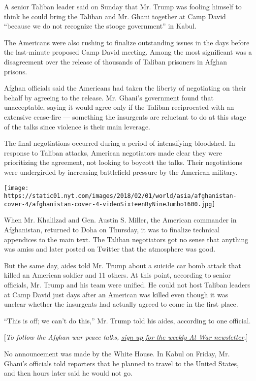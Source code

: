 A senior Taliban leader said on Sunday that Mr. Trump was fooling
himself to think he could bring the Taliban and Mr. Ghani together at
Camp David ``because we do not recognize the stooge government'' in
Kabul.

The Americans were also rushing to finalize outstanding issues in the
days before the last-minute proposed Camp David meeting. Among the most
significant was a disagreement over the release of thousands of Taliban
prisoners in Afghan prisons.

Afghan officials said the Americans had taken the liberty of negotiating
on their behalf by agreeing to the release. Mr. Ghani's government found
that unacceptable, saying it would agree only if the Taliban
reciprocated with an extensive cease-fire --- something the insurgents
are reluctant to do at this stage of the talks since violence is their
main leverage.

The final negotiations occurred during a period of intensifying
bloodshed. In response to Taliban attacks, American negotiators made
clear they were prioritizing the agreement, not looking to boycott the
talks. Their negotiations were undergirded by increasing battlefield
pressure by the American military.

\texttt{[image: https://static01.nyt.com/images/2018/02/01/world/asia/afghanistan-cover-4/afghanistan-cover-4-videoSixteenByNineJumbo1600.jpg]}

When Mr. Khalilzad and Gen. Austin S. Miller, the American commander in
Afghanistan, returned to Doha on Thursday, it was to finalize technical
appendices to the main text. The Taliban negotiators got no sense that
anything was amiss and later posted on Twitter that the atmosphere was
good.

But the same day, aides told Mr. Trump about a suicide car bomb attack
that killed an American soldier and 11 others. At this point, according
to senior officials, Mr. Trump and his team were unified. He could not
host Taliban leaders at Camp David just days after an American was
killed even though it was unclear whether the insurgents had actually
agreed to come in the first place.

``This is off; we can't do this,'' Mr. Trump told his aides, according
to one official.

{[}\emph{To follow the Afghan war peace talks,}
\href{https://www.nytimes.com/newsletters/at-war}{\emph{sign up for the
weekly At War newsletter}}\emph{.}{]}

No announcement was made by the White House. In Kabul on Friday, Mr.
Ghani's officials told reporters that he planned to travel to the United
States, and then hours later said he would not go.

